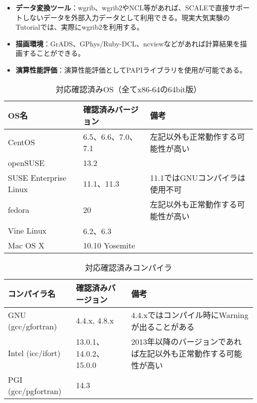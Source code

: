 \begin{itemize}
  \item {\bf データ変換ツール}：wgrib、wgrib2やNCL等があれば、SCALEで直接サポートしないデータを外部入力データとして利用できる。現実大気実験のTutorialでは、実際にwgrib2を利用する。
  \item {\bf 描画環境}：GrADS、GPhys/Ruby-DCL、ncviewなどがあれば計算結果を描画することができる。
  \item {\bf 演算性能評価}：演算性能評価としてPAPIライブラリを使用が可能である。
\end{itemize}


\begin{table}[htb]
\begin{center}
\caption{対応確認済みOS（全てx86-64の64bit版）}
\begin{tabularx}{150mm}{|l|l|X|} \hline
 \rowcolor[gray]{0.9} OS名 & 確認済みバージョン & 備考 \\ \hline
 CentOS                & 6.5、6.6、7.0、7.1 & 左記以外も正常動作する可能性が高い \\ \hline
 openSUSE              & 13.2               &  \\ \hline
 SUSE Enterprise Linux & 11.1、11.3         & 11.1ではGNUコンパイラは使用不可 \\ \hline
 fedora                & 20                 & 左記以外も正常動作する可能性が高い \\ \hline
 Vine Linux            & 6.2、6.3           &  \\ \hline
 Mac OS X              & 10.10 Yosemite     &  \\ \hline
\end{tabularx}
\label{tab:compatible_os}
\end{center}
\end{table}

\begin{table}[htb]
\begin{center}
\caption{対応確認済みコンパイラ}
\begin{tabularx}{150mm}{|l|l|X|} \hline
 \rowcolor[gray]{0.9} コンパイラ名 & 確認済みバージョン & 備考 \\ \hline
 GNU (gcc/gfortran)    & 4.4.x, 4.8.x           & 4.4.xではコンパイル時にWarningが出ることがある \\ \hline
 Intel (icc/ifort)     & 13.0.1、14.0.2、15.0.0 & 2013年以降のバージョンであれば左記以外も正常動作する可能性が高い\\ \hline
 PGI (gcc/pgfortran)   & 14.3                   &  \\ \hline
\end{tabularx}
\label{tab:compatible_compiler}
\end{center}
\end{table}

